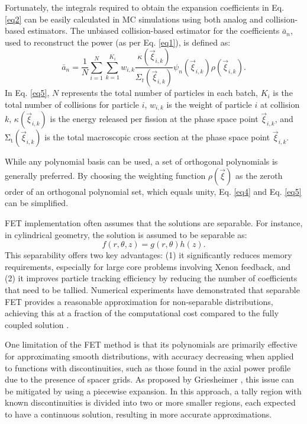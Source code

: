 Fortunately, the integrals required to obtain the expansion coefficients in Eq. \ref{eq2} can be easily calculated in MC simulations using both analog and collision-based estimators. The unbiased collision-based estimator for the coefficients ${\bar{a}}_n$, used to reconstruct the power (as per Eq. \ref{eq1}), is defined as:
\begin{equation}
    {\bar{a}}_n=\frac{1}{N}\sum_{i=1}^{N}{\sum_{k=1}^{K_i}{w_{i,k}\frac{\kappa\left({\vec{\xi}}_{i,k}\right)}{\Sigma_t\left({\vec{\xi}}_{i,k}\right)}}\psi_n\left({\vec{\xi}}_{i,k}\right)\rho\left({\vec{\xi}}_{i,k}\right)}.
    \label{eq5}
\end{equation}
In Eq. \ref{eq5}, $N$ represents the total number of particles in each batch, $K_i$ is the total number of collisions for particle $i$, $w_{i,k}$ is the weight of particle $i$ at collision $k$, $\kappa\left({\vec{\xi}}_{i,k}\right)$ is the energy released per fission at the phase space point ${\vec{\xi}}_{i,k}$, and $\mathrm{\Sigma}_\mathrm{t}\left({\vec{\xi}}_{i,k}\right)$ is the total macroscopic cross section at the phase space point ${\vec{\xi}}_{i,k}$.

While any polynomial basis can be used, a set of orthogonal polynomials is generally preferred. By choosing the weighting function $\rho\left(\vec{\xi}\right)$ as the zeroth order of an orthogonal polynomial set, which equals unity, Eq. \ref{eq4} and Eq. \ref{eq5} can be simplified.

FET implementation often assumes that the solutions are separable. For instance, in cylindrical geometry, the solution is assumed to be separable as:
\begin{equation}
f\left(r,\theta,z\right)=g\left(r,\theta\right)h\left(z\right).
\end{equation}
This separability offers two key advantages: (1) it significantly reduces memory requirements, especially for large core problems involving Xenon feedback, and (2) it improves particle tracking efficiency by reducing the number of coefficients that need to be tallied. Numerical experiments have demonstrated that separable FET provides a reasonable approximation for non-separable distributions, achieving this at a fraction of the computational cost compared to the fully coupled solution \cite{gries}.

One limitation of the FET method is that its polynomials are primarily effective for approximating smooth distributions, with accuracy decreasing when applied to functions with discontinuities, such as those found in the axial power profile due to the presence of spacer grids. As proposed by Griesheimer \cite{gries}, this issue can be mitigated by using a piecewise expansion. In this approach, a tally region with known discontinuities is divided into two or more smaller regions, each expected to have a continuous solution, resulting in more accurate approximations.

